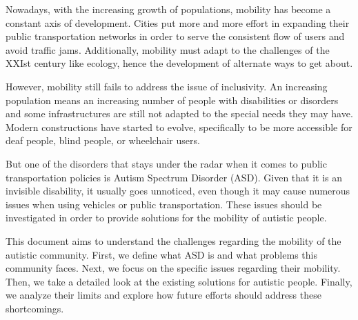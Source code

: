 
Nowadays, with the increasing growth of populations, mobility has become a constant axis of development. Cities put more and more effort in expanding their public transportation networks in order to serve the consistent flow of users and avoid traffic jams. Additionally, mobility must adapt to the challenges of the XXIst century like ecology, hence the development of alternate ways to get about.

However, mobility still fails to address the issue of inclusivity. An increasing population means an increasing number of people with disabilities or disorders and some infrastructures are still not adapted to the special needs they may have. Modern constructions have started to evolve, specifically to be more accessible for deaf people, blind people, or wheelchair users.

But one of the disorders that stays under the radar when it comes to public transportation policies is Autism Spectrum Disorder (ASD). Given that it is an invisible disability, it usually goes unnoticed, even though it may cause numerous issues when using vehicles or public transportation. These issues should be investigated in order to provide solutions for the mobility of autistic people.

This document aims to understand the challenges regarding the mobility of the autistic community. First, we define what ASD is and what problems this community faces. Next, we focus on the specific issues regarding their mobility. Then, we take a detailed look at the existing solutions for autistic people. Finally, we analyze their limits and explore how future efforts should address these shortcomings.
